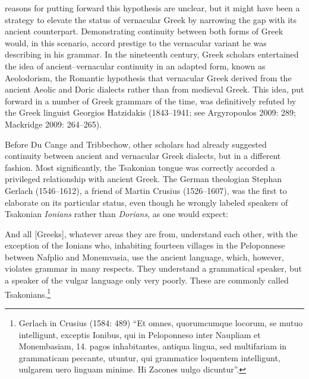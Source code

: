 \documentclass[12pt]{article}
\newenvironment{styleStandard}{\renewcommand\baselinestretch{1.25}\setlength\leftskip{0in}\setlength\rightskip{0in}\setlength\parindent{0.1972in}\setlength\parfillskip{0pt plus 1fil}\setlength\parskip{0in plus 1pt}\writerlistparindent\writerlistleftskip\leavevmode\normalfont\normalsize\writerlistlabel\ignorespaces}{\unskip\vspace{0in plus 1pt}\par}
\newenvironment{styleQuote}{\renewcommand\baselinestretch{1.25}\setlength\leftskip{0.3937in}\setlength\rightskip{0in}\setlength\parindent{0in}\setlength\parfillskip{0pt plus 1fil}\setlength\parskip{0.1665in plus 0.016649999in}\writerlistparindent\writerlistleftskip\leavevmode\normalfont\normalsize\writerlistlabel\ignorespaces}{\unskip\vspace{0.1665in plus 0.016649999in}\par}
\newcommand\writerlistleftskip{}
\newcommand\writerlistparindent{}
\newcommand\writerlistlabel{}
\begin{document}
\begin{styleStandard}
reasons for putting forward this hypothesis are unclear, but it might have been a strategy to elevate the status of vernacular Greek by narrowing the gap with its ancient counterpart. Demonstrating continuity between both forms of Greek would, in this scenario, accord prestige to the vernacular variant he was describing in his grammar. In the nineteenth century, Greek scholars entertained the idea of ancient–vernacular continuity in an adapted form, known as Aeolodorism, the Romantic hypothesis that vernacular Greek derived from the ancient Aeolic and Doric dialects rather than from medieval Greek. This idea, put forward in a number of Greek grammars of the time, was definitively refuted by the Greek linguist Georgios Hatzidakis (1843–1941; see Argyropoulos 2009: 289; Mackridge 2009: 264–265).
\end{styleStandard}

\begin{styleStandard}
Before Du Cange and Tribbechow, other scholars had already suggested continuity between ancient and vernacular Greek dialects, but in a different fashion. Most significantly, the Tsakonian tongue was correctly accorded a privileged relationship with ancient Greek. The German theologian Stephan Gerlach (1546–1612), a friend of Martin Crusius (1526–1607), was the first to elaborate on its particular status, even though he wrongly labeled speakers of Tsakonian \textit{Ionians} rather than \textit{Dorians}, as one would expect:
\end{styleStandard}

\begin{styleQuote}
And all [Greeks], whatever areas they are from, understand each other, with the exception of the Ionians who, inhabiting fourteen villages in the Peloponnese between Nafplio and Monemvasia, use the ancient language, which, however, violates grammar in many respects. They understand a grammatical speaker, but a speaker of the vulgar language only very poorly. These are commonly called Tsakonians.\footnote{ Gerlach in Crusius (1584: 489) “Et omnes, quorumcumque locorum, se mutuo intelligunt, exceptis Ionibus, qui in Peloponneso inter Naupliam et Monembasiam, 14. pagos inhabitantes, antiqua lingua, sed multifariam in grammaticam peccante, utuntur, qui grammatice loquentem intelligunt, uulgarem uero linguam minime. Hi Zacones uulgo dicuntur”.}
\end{styleQuote}
\end{document}
